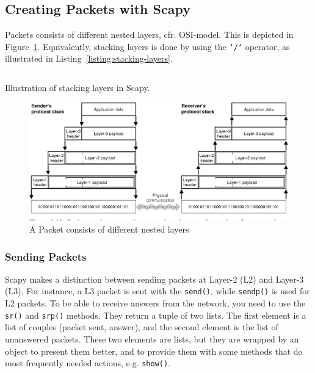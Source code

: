 \documentclass[11pt,a4paper]{article}
\begin{document}
\subsection{Creating Packets with Scapy}
Packets consists of different nested layers, cfr. OSI-model. This is depicted in Figure~\ref{fig:nested_layers_packet}. Equivalently, stacking layers is done by using the \texttt{`/`} operator, as illustrated in Listing~\ref{listing:stacking-layers}.

\begin{listing}[h]
\inputminted{python}{../code_students/example_stacking_layers.py}
\caption{Illustration of stacking layers in Scapy.}%
\label{listing:stacking-layers}
\end{listing}



\begin{figure}
    \centering
    \includegraphics[width=\textwidth]{packet_layered.png}
    \caption{A Packet consists of different nested layers}%
    \label{fig:nested_layers_packet}
\end{figure}


 \subsubsection{Sending Packets}
 Scapy makes a distinction between sending packets at Layer-2 (L2) and Layer-3 (L3). For instance, a L3 packet is sent with the \texttt{send()}, while \texttt{sendp()} is used for L2 packets. To be able to receive answers from the network, you need to use the \texttt{sr()} and \texttt{srp()} methods. They return a tuple of two lists. The first element is a list of couples (packet sent, answer), and the second element is the list of unanswered packets. These two elements are lists, but they are wrapped by an object to present them better, and to provide them with some methods that do most frequently needed actions, e.g. \texttt{show()}.
 
\end{document}
